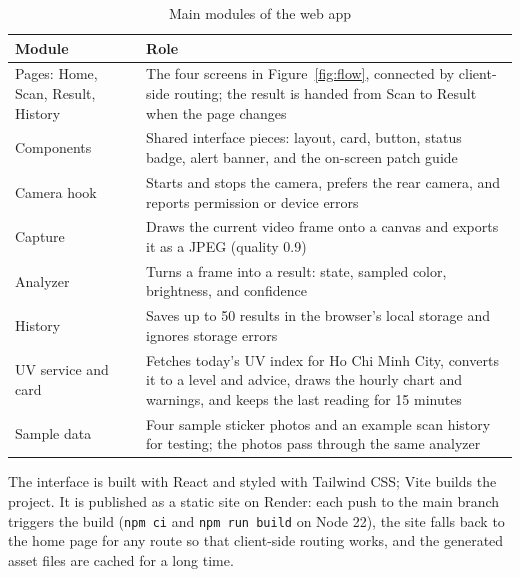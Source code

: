 \begin{table}[ht]
\centering\small
\caption{Main modules of the web app}\label{tab:modules}
\begin{tabular}{@{}L{4.6cm}L{9.6cm}@{}}
  \toprule
  \textbf{Module} & \textbf{Role}\\
  \midrule
  Pages: Home, Scan, Result, History & The four screens in Figure~\ref{fig:flow}, connected by client-side routing; the result is handed from Scan to Result when the page changes\\
  \addlinespace
  Components & Shared interface pieces: layout, card, button, status badge, alert banner, and the on-screen patch guide\\
  \addlinespace
  Camera hook & Starts and stops the camera, prefers the rear camera, and reports permission or device errors\\
  \addlinespace
  Capture & Draws the current video frame onto a canvas and exports it as a JPEG (quality 0.9)\\
  \addlinespace
  Analyzer & Turns a frame into a result: state, sampled color, brightness, and confidence\\
  \addlinespace
  History & Saves up to 50 results in the browser's local storage and ignores storage errors\\
  \addlinespace
  UV service and card & Fetches today's UV index for Ho Chi Minh City, converts it to a level and advice, draws the hourly chart and warnings, and keeps the last reading for 15 minutes\\
  \addlinespace
  Sample data & Four sample sticker photos and an example scan history for testing; the photos pass through the same analyzer\\
  \bottomrule
\end{tabular}
\end{table}

The interface is built with React and styled with Tailwind CSS; Vite builds the project. It is
published as a static site on Render: each push to the main branch triggers the build
(\texttt{npm ci} and \texttt{npm run build} on Node 22), the site falls back to the home page for any
route so that client-side routing works, and the generated asset files are cached for a long time.

